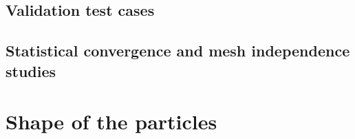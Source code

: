 \documentclass[12pt]{My_preprint}
\begin{document}
\subsection{Validation test cases}

\subsection{Statistical convergence and mesh independence studies}


\section{Shape of the particles}
\label{app:shape}




\end{document}
